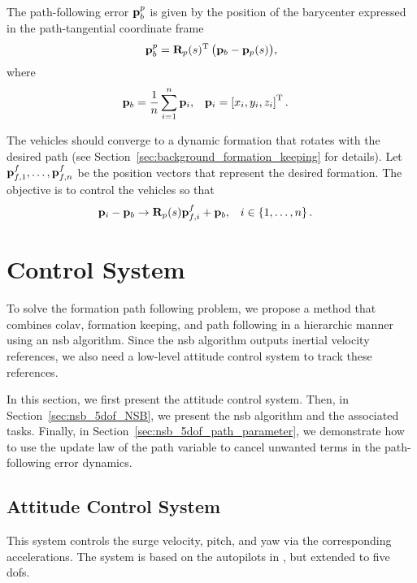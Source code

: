 The path-following error $\mathbf{p}_b^p$ is given by the position of the barycenter expressed in the path-tangential coordinate frame
\begin{equation}
    \mathbf{p}_b^p = \mathbf{R}_p(s)^{\mathrm{T}} \, \big(\mathbf{p}_b - \mathbf{p}_p(s)\big), \label{eq:nsb_5dof_barycenter}
\end{equation}
where
\begin{align}
    \mathbf{p}_b &= \frac{1}{n} \sum_{i=1}^n \mathbf{p}_i, & 
    \mathbf{p}_i &= \left[x_i, y_i, z_i\right]^{\mathrm{T}}.
\end{align}

The vehicles should converge to a dynamic formation that rotates with the desired path (see Section~\ref{sec:background_formation_keeping} for details).
Let $\mathbf{p}_{f,1}^f, \ldots, \mathbf{p}_{f,n}^f$ be the position vectors that represent the desired formation.
The objective is to control the vehicles so that
\begin{align}
    \mathbf{p}_i - \mathbf{p}_b &\rightarrow \mathbf{R}_p(s) \mathbf{p}_{f,i}^f + \mathbf{p}_b, &
    i &\in \left\{1, \ldots, n \right\}.
\end{align}

\section{Control System}
\label{sec:nsb_5dof_control}
To solve the formation path following problem, we propose a method that combines \acrfull{colav}, formation keeping, and path following in a hierarchic manner using an \gls{nsb} algorithm.
Since the \gls{nsb} algorithm outputs inertial velocity references, we also need a low-level attitude control system to track these references.

In this section, we first present the attitude control system.
Then, in Section~\ref{sec:nsb_5dof_NSB}, we present the \gls{nsb} algorithm and the associated tasks.
Finally, in Section~\ref{sec:nsb_5dof_path_parameter}, we demonstrate how to use the update law of the path variable to cancel unwanted terms in the path-following error dynamics.

\subsection{Attitude Control System}
\label{sec:nsb_5dof_ACS}
This system controls the surge velocity, pitch, and yaw via the corresponding accelerations.
The system is based on the autopilots in \cite{moe_LOS_2016}, but extended to five \glspl{dof}.

